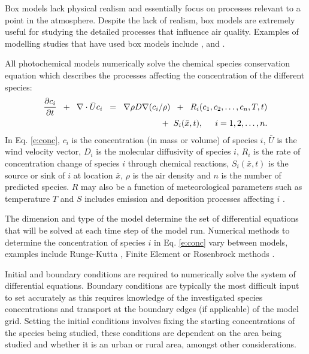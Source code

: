 Box models lack physical realism and essentially focus on processes relevant to a point in the atmosphere.
Despite the lack of realism, box models are extremely useful for studying the detailed processes that influence air quality.
Examples of modelling studies that have used box models include \citet{Bin:2007}, \citet{Li:2014b} and \citet{Noelscher:2014}.

All photochemical models numerically solve the chemical species conservation equation which describes the processes affecting the concentration of the different species:
\begin{equation} \label{e:conc}
    \begin{split}
        \frac{\partial c_i}{\partial t} \hspace{2mm} + \hspace{2mm} \nabla \cdot \bar{U}c_i \hspace{2mm} = \hspace{2mm} \nabla \rho D \nabla(c_i/\rho) \hspace{2mm} + \hspace{2mm} R_i(c_1, c_2, \dots, c_n, T, t) \\ + \hspace{2mm} S_i(\bar{x}, t), \hspace{5mm} i = 1, 2, \dots, n.
    \end{split}
\end{equation}
In Eq. \eqref{e:conc}, $c_i$ is the concentration (in mass or volume) of species $i$, $\bar{U}$ is the wind velocity vector, $D_i$ is the molecular diffusivity of species $i$, $R_i$ is the rate of concentration change of species $i$ through chemical reactions, $S_i(\bar{x}, t)$ is the source or sink of $i$ at location $\bar{x}$, $\rho$ is the air density and $n$ is the number of predicted species.
$R$ may also be a function of meteorological parameters such as temperature $T$ and $S$ includes emission and deposition processes affecting $i$ \citep{Russell:2000}.

The dimension and type of the model determine the set of differential equations that will be solved at each time step of the model run. 
Numerical methods to determine the concentration of species $i$ in Eq. \eqref{e:conc} vary between models, examples include Runge-Kutta \citep{Sandu:1997b}, Finite Element \citep{Russell:2000} or Rosenbrock methods \citep{Sandu:1997a}.

Initial and boundary conditions are required to numerically solve the system of differential equations.
Boundary conditions are typically the most difficult input to set accurately as this requires knowledge of the investigated species concentrations and transport at the boundary edges (if applicable) of the model grid.  
Setting the initial conditions involves fixing the starting concentrations of the species being studied, these conditions are dependent on the area being studied and whether it is an urban or rural area, amongst other considerations. 


